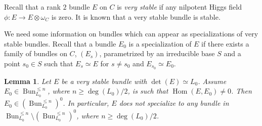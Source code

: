 \documentclass[12pt,reqno]{amsart}
\newtheorem{lemma}[theorem]{Lemma}
\theoremstyle{definition}
\theoremstyle{remark}
\numberwithin{equation}{section}
\newcommand{\ot}{\otimes}
\newcommand{\Hom}{\operatorname{Hom}}
\newcommand{\om}{\omega}
\newcommand{\Bun}{{\operatorname{Bun}}}
\begin{document}

Recall that a rank $2$ bundle $E$ on $C$ is {\it very stable} if any nilpotent Higgs field $\phi:E\to E\ot\om_C$ is zero. It is known that a very stable bundle is stable.

We need some information on bundles which can appear as specializations of very stable bundles.
Recall that a bundle $E_0$ is a specialization of $E$ if there exists a family of bundles on $C$, $(E_s)$, parametrized by an irreducible base $S$ and a point $s_0\in S$
such that $E_s\simeq E$ for $s\neq s_0$ and $E_{s_0}\simeq E_0$.
 
\begin{lemma}\label{odd-degree-closure-lem}
Let $E$ be a very stable bundle with $\det(E)\simeq L_0$. 
Assume $E_0\in \Bun_{L_0}^{\le n}$, where $n\ge \deg(L_0)/2$, is such that $\Hom(E,E_0)\neq 0$.
Then $E_0\in (\Bun_{L_0}^{\le n})^0$.
In particular, $E$ does not specialize to any bundle in $\Bun_{L_0}^{\le n}\setminus (\Bun_{L_0}^{\le n})^0$, where
$n\ge\deg(L_0)/2$.
\end{lemma}
\end{document}
